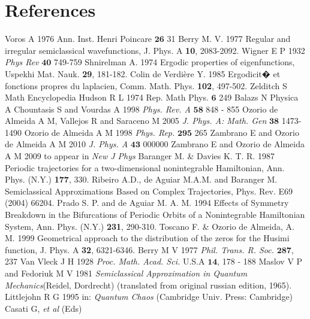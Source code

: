 \documentclass[12pt]{iopart}
\begin{document}
\section*{References}
\begin{thebibliography}{99}
 Voros A 1976 Ann. Inst. Henri Poincare $\bm{26}$ 31
 Berry M. V. 1977 Regular and irregular semiclassical wavefunctions,
J. Phys. A {\bf 10}, 2083-2092.
 Wigner E P 1932 \emph{Phys Rev} $\bm{40}$ 749-759
 Shnirelman A. 1974 Ergodic properties of eigenfunctions, Uspekhi Mat. Nauk. {\bf 29}, 181-182.
  Colin de Verdi\`ere Y. 1985 Ergodicit� et fonctions propres du laplacien, 
Comm. Math. Phys. {\bf 102}, 497-502.
 Zelditch S Math Encyclopedia
 Hudson R L 1974 Rep. Math Phys. $\bm{6}$ 249
 Balazs N Physica A
 Chountasis S and Vourdas A 1998
         \emph{Phys. Rev. A} $\bm{58}$ 848 - 855 
 Ozorio de Almeida A M, Vallejos R and Saraceno M 2005
        \emph{J. Phys. A: Math. Gen} $\bm{38}$ 1473-1490 
 Ozorio de Almeida A M 1998
        \emph{Phys. Rep.} $\bm{295}$ 265
 Zambrano E and Ozorio de Almeida A M 2010 \emph{J. Phys. A} $\bm{43}$ 000000 
 Zambrano E and Ozorio de Almeida A M 2009 
        to appear in \emph{New J Phys}
 Baranger M. \& Davies K. T. R. 1987 Periodic trajectories for a two-dimensional nonintegrable
Hamiltonian,  Ann. Phys. (N.Y.) {\bf 177}, 330.
 Ribeiro A.D., de Aguiar M.A.M. and Baranger M. 
Semiclassical Approximations Based on Complex Trajectories, Phys. Rev. E69 (2004) 66204.
 Prado S. P. and de Aguiar M. A. M. 1994 Effects of Symmetry Breakdown 
in the Bifurcations of Periodic Orbits of a Nonintegrable Hamiltonian System, 
Ann. Phys. (N.Y.) {\bf 231},  290-310.
  Toscano F. \& Ozorio de Almeida, A. M. 1999
Geometrical approach to the distribution of the zeros for the Husimi function,
J. Phys. A {\bf 32}, 6321-6346.
 Berry M V 1977
             \emph{Phil. Trans. R. Soc.} $\bm{287}$, 237
 Van Vleck J H 1928
        \emph{Proc. Math. Acad. Sci.} U.S.A $\bm{14}$, 178 - 188
 Maslov V P and Fedoriuk M V 1981
        \emph{Semiclassical Approximation in Quantum Mechanics}(Reidel, Dordrecht)
        (translated from original russian edition, 1965).
 Littlejohn R G 1995 
             in: \emph{Quantum Chaos} (Cambridge Univ. Press: Cambridge)  Casati G, \emph{et al} (Eds)

\end{thebibliography}
\end{document}

